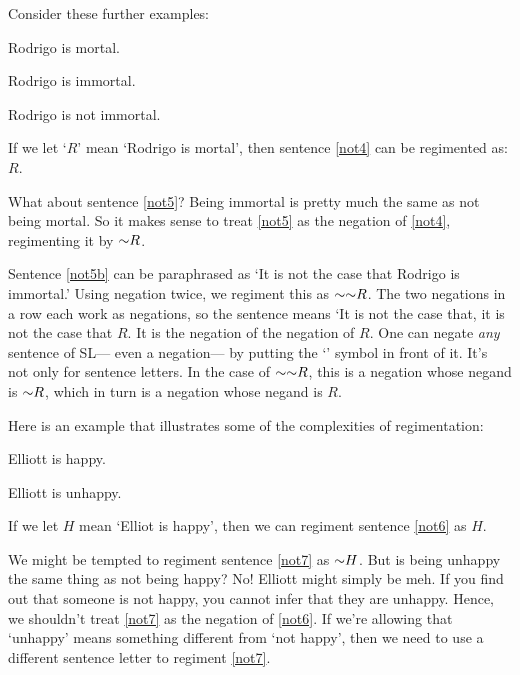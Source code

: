 
Consider these further examples:

\begin{earg}
\item[\ex{not4}] Rodrigo is mortal.
\item[\ex{not5}] Rodrigo is immortal.
\item[\ex{not5b}] Rodrigo is not immortal.
\end{earg}

If we let `$R$' mean `Rodrigo is mortal', then sentence \ref{not4} can be regimented as: $R$.

What about sentence \ref{not5}? Being immortal is pretty much the same as not being mortal.
So it makes sense to treat \ref{not5} as the negation of \ref{not4}, regimenting it by $\enot{R}$.

Sentence \ref{not5b} can be paraphrased as `It is not the case that Rodrigo is immortal.'
Using negation twice, we regiment this as $\enot \enot R$.
The two negations in a row each work as negations, so the sentence means `It is not the case that, it is not the case that $R$.
It is the negation of the negation of $R$.
One can negate \emph{any} sentence of SL--- even a negation--- by putting the `\enot' symbol in front of it.
It's not only for sentence letters.
In the case of $\enot\enot R$, this is a negation whose negand is $\enot R$, which in turn is a negation whose negand is $R$.

Here is an example that illustrates some of the complexities of regimentation:

\begin{earg}
\item[\ex{not6}] Elliott is happy.
\item[\ex{not7}] Elliott is unhappy.
\end{earg}

If we let $H$ mean `Elliot is happy', then we can regiment sentence \ref{not6} as $H$.

We might be tempted to regiment sentence \ref{not7} as $\enot{H}$.
But is being unhappy the same thing as not being happy? 
No! 
Elliott might simply be meh.
If you find out that someone is not happy, you cannot infer that they are unhappy.
Hence, we shouldn't treat \ref{not7} as the negation of \ref{not6}.
If we're allowing that `unhappy' means something different from `not happy', then we need to use a different sentence letter to regiment \ref{not7}.

